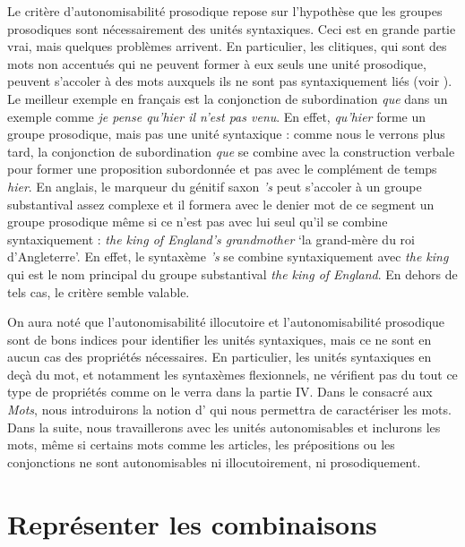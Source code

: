 Le critère d’autonomisabilité prosodique repose sur l’hypothèse que les groupes prosodiques sont nécessairement des unités syntaxiques. Ceci est en grande partie vrai, mais quelques problèmes arrivent. En particulier, les clitiques, qui sont des mots non accentués qui ne peuvent former à eux seuls une unité prosodique, peuvent s’accoler à des mots auxquels ils ne sont pas syntaxiquement liés (voir ). Le meilleur exemple en français est la conjonction de subordination \textit{que} dans un exemple comme \textit{je pense {\textbar} qu’hier {\textbar} il n’est pas venu}. En effet, \textit{qu’hier} forme un groupe prosodique, mais pas une unité syntaxique : comme nous le verrons plus tard, la conjonction de subordination \textit{que} se combine avec la construction verbale pour former une proposition subordonnée et pas avec le complément de temps \textit{hier}. En anglais, le marqueur du génitif saxon \textit{’s} peut s’accoler à un groupe substantival assez complexe et il formera avec le denier mot de ce segment un groupe prosodique même si ce n’est pas avec lui seul qu’il se combine syntaxiquement : \textit{the king {\textbar} of England’s {\textbar} grandmother} ‘la grand-mère du roi d’Angleterre’. En effet, le syntaxème \textit{’s} se combine syntaxiquement avec \textit{the king} qui est le nom principal du groupe substantival \textit{the king of England}. En dehors de tels cas, le critère semble valable.

On aura noté que l’autonomisabilité illocutoire et l’autonomisabilité prosodique sont de bons indices pour identifier les unités syntaxiques, mais ce ne sont en aucun cas des propriétés nécessaires. En particulier, les unités syntaxiques en deçà du mot, et notamment les syntaxèmes flexionnels, ne vérifient pas du tout ce type de propriétés comme on le verra dans la partie IV. Dans le  consacré aux \textit{Mots}, nous introduirons la notion d’ qui nous permettra de caractériser les mots. Dans la suite, nous travaillerons avec les unités autonomisables et inclurons les mots, même si certains mots comme les articles, les prépositions ou les conjonctions ne sont autonomisables ni illocutoirement, ni prosodiquement.

\section{Représenter les combinaisons}\label{sec:3.2.12}


